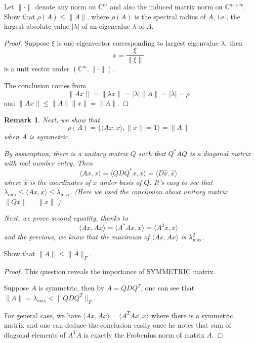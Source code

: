 \documentclass[dvipsnames, 12pt]{article}
\newtheorem{Remark}[Theorem]{Remark}
\begin{document}
\begin{problem}{}
    Let $\|\cdot\|$ denote any norm on $\mathbb{C}^m$ and also the induced matrix norm on $\mathbb{C}^{m \times m}$. Show that $\rho(A) \leq\|A\|$, where $\rho(A)$ is the spectral radius of $A$, i.e., the largest absolute value $|\lambda|$ of an eigenvalue $\lambda$ of $A$.
\end{problem}

\begin{proof}
    Suppose $\xi$ is one eigenvector corresponding to largest eigenvalue $\lambda$, then 
    $$
    x=\frac{\xi}{\|\xi\|}
    $$
    is a unit vector under $(\mathbb{C}^{m}, \|\cdot \|)$. 
    
    The conclusion comes from
    $$
    \|Ax\|=\| \lambda x\| = |\lambda| \|A\| =|\lambda| =\rho
    $$
    and $\|Ax\| \leq \|A\| \|x\| = \|A\|$. 
\end{proof}


\begin{Remark}
    Next, we show that 
    $$
    \rho(A) = \{\langle Ax,x\rangle, \|x\| = 1\} = \|A\|
    $$
    when $A$ is symmetric.

    By assumption, there is a unitary matrix $Q$ such that $Q^{*}AQ$ is a diagonal matrix with real number entry. Then
    $$
    \langle Ax,x\rangle = \langle QDQ^{*}x,x\rangle =\langle D\hat{x}, \hat{x}\rangle
    $$
    where $\hat{x}$ is the coordinates of $x$ under basis of $Q$. It's easy to see that $\lambda_{\min} \leq \langle Ax,x\rangle \leq \lambda_{\max}$. (Here we used the conclusion about unitary matrix $\|Qx\|=\|x\|$.)

    Next, we prove second equality, thanks to
    $$
    \langle Ax,Ax\rangle = \langle A^{*}Ax,x\rangle = \langle A^{2}x,x\rangle
    $$
    and the previous, we know that the maximum of $\langle Ax,Ax\rangle$ is $\lambda^{2}_{\max}$.
    
\end{Remark}

\begin{problem}{}
    Show that $\|A\| \leq \|A\|_{F}$.
\end{problem}

\begin{proof}
    This question reveals the importance of SYMMETRIC matrix.

    Suppose $A$ is symmetric, then by $A= QDQ^{T}$, one can see that $\|A\| = \lambda_{\max} < \|QDQ^{T}\|_{F}$.

    For general case, we have $\langle Ax, Ax\rangle = \langle A^{T}Ax, x\rangle$ where there is a symmetric matrix and one can deduce the conclusion easily once he
    notes that sum of diagonal elements of $A^{T}A$ is exactly the Frobenius norm of matrix $A$.
\end{proof}
\end{document}
